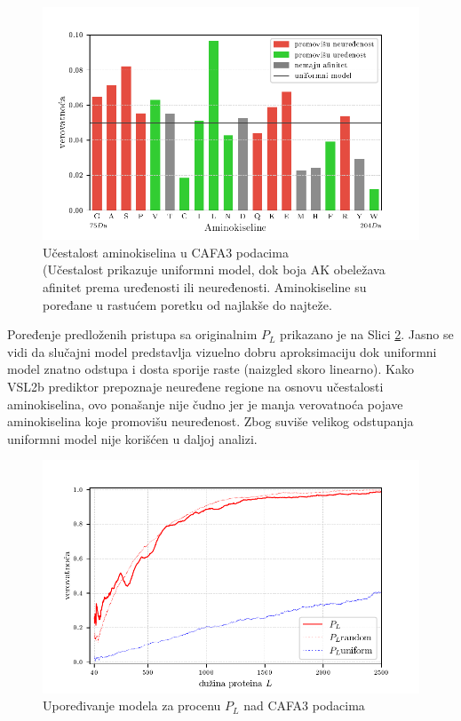 \begin{figure}[th]
\centering
\includegraphics[]{plots/AK_ucestalost}
\caption{
  Učestalost aminokiselina u CAFA3 podacima
  \\ \footnotesize
  (Učestalost prikazuje uniformni model, dok boja AK obeležava afinitet prema
  uređenosti ili neuređenosti. Aminokiseline su poređane u rastućem poretku
  od najlakše do najteže. 
}
\label{fig:AK_ucestalost}
\end{figure}

Poređenje predloženih pristupa sa originalnim $P_L$ prikazano je na Slici
\ref{fig:PL2}. Jasno se vidi
da slučajni model predstavlja vizuelno dobru aproksimaciju dok uniformni model
znatno odstupa i dosta sporije raste (naizgled skoro linearno). Kako VSL2b
prediktor prepoznaje neuređene regione na osnovu učestalosti aminokiselina, ovo
ponašanje nije čudno jer je manja verovatnoća pojave aminokiselina koje
promovišu neuređenost. Zbog suviše velikog odstupanja uniformni model nije
korišćen u daljoj analizi.


\begin{figure}[th]
\centering
\includegraphics[]{plots/PL_F_cmp}
\caption{Upoređivanje modela za procenu $P_L$ nad CAFA3 podacima}
\label{fig:PL2}
\end{figure}


